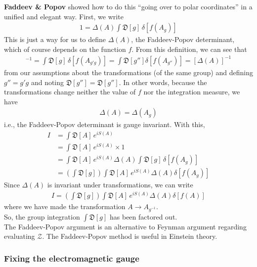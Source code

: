\documentclass{book}
\theoremstyle{definition}
\newcommand{\nn}{\nonumber}
\newcommand{\lp}{\left(}
\newcommand{\rp}{\right)}
\newcommand{\Z}{\mathcal{Z}}
\begin{document}
\textbf{Faddeev \& Popov} showed how to do this ``going over to polar coordinates'' in a unified and elegant way. First, we write
\begin{align}
\boxed{1 = \Delta(A) \int \mathfrak{D}[g] \, \delta[f(A_g)]}
\end{align}
This is just a way for us to define $\Delta(A)$, the Faddeev-Popov determinant, which of course depends on the function $f$. From this definition, we can see that
\begin{align}
[\Delta(A_{g'})]^{-1} = \int \mathfrak{D}[g]\,\delta[f(A_{g'g})] = \int\mathfrak{D}[g''] \delta[f(A_{g''})] = [\Delta(A)]^{-1}
\end{align}
from our assumptions about the transformations (of the same group) and defining $g'' = g'g$ and noting $\mathfrak{D}[g''] = \mathfrak{D}[g'']$. In other words, because the transformations change neither the value of $f$ nor the integration measure, we have
\begin{align}
\boxed{\Delta(A) = \Delta(A_g)}
\end{align}
i.e., the Faddeev-Popov determinant is gauge invariant. With this,
\begin{align}
I &= \int \mathfrak{D}[A]\, e^{iS(A)} \nn\\
&= \int \mathfrak{D}[A]\, e^{iS(A)} \times 1 \nn\\
&= \int \mathfrak{D}[A]\, e^{iS(A)} \Delta(A) \int \mathfrak{D}[g] \, \delta[f(A_g)] \nn\\
&= \lp \int \mathfrak{D}[g]\rp \int \mathfrak{D}[A]\,e^{iS(A)}\Delta(A)\delta[f(A_g)]
\end{align}
Since $\Delta(A)$ is invariant under transformations, we can write
\begin{align}
\boxed{I = \lp \int \mathfrak{D}[g]\rp \int \mathfrak{D}[A]\,e^{iS(A)}\Delta(A)\delta[f(A)]}
\end{align}
where we have made the transformation $A \to A_{g^{-1}}$. \\

So, the group integration $\int \mathfrak{D}[g]$ has been factored out. \\

The Faddeev-Popov argument is an alternative to Feynman argument regarding evaluating $\Z$. The Faddeev-Popov method is useful in Einstein theory. 




\subsubsection{Fixing the electromagnetic gauge}
\end{document}
